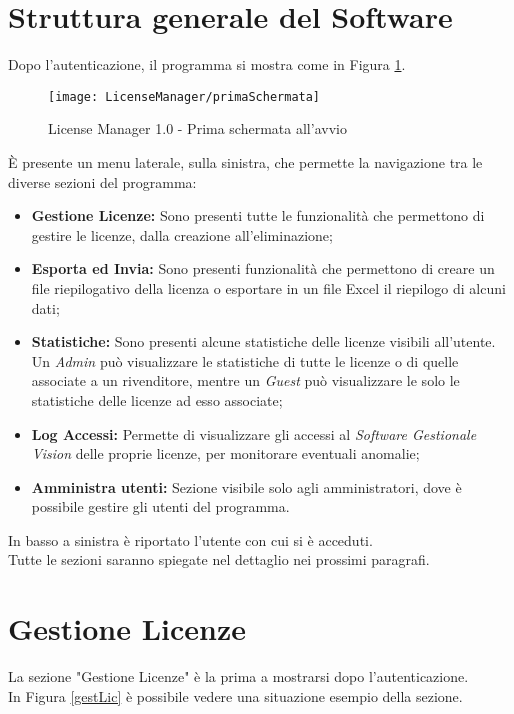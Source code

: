 \section{Struttura generale del Software}
Dopo l'autenticazione, il programma si mostra come in Figura \ref{primscher}.

\begin{figure}[!h] 
    \centering 
    \texttt{[image: LicenseManager/primaSchermata]} 
    \caption{License Manager 1.0 - Prima schermata all'avvio}
    \label{primscher}
\end{figure}

È presente un menu laterale, sulla sinistra, che permette la navigazione tra le diverse sezioni del programma:

\begin{itemize}
\item \textbf{Gestione Licenze:} Sono presenti tutte le funzionalità che permettono di gestire le licenze, dalla creazione all’eliminazione;
\item \textbf{Esporta ed Invia:} Sono presenti funzionalità che permettono di creare un file riepilogativo della licenza o esportare in un file Excel il riepilogo di alcuni dati;
\item \textbf{Statistiche:} Sono presenti alcune statistiche delle licenze visibili all’utente. Un \textit{Admin} può visualizzare le statistiche di tutte le licenze o di quelle associate a un rivenditore, mentre un \textit{Guest} può visualizzare le solo le statistiche delle licenze ad esso associate;
\item \textbf{Log Accessi:} Permette di visualizzare gli accessi al \textit{Software Gestionale Vision} delle proprie licenze, per monitorare eventuali anomalie;
\item \textbf{Amministra utenti:} Sezione visibile solo agli amministratori, dove è possibile gestire gli utenti del programma.

\end{itemize}

In basso a sinistra è riportato l’utente con cui si è acceduti.
\\
Tutte le sezioni saranno spiegate nel dettaglio nei prossimi paragrafi.

\newpage
\section{Gestione Licenze}
La sezione "Gestione Licenze" è la prima a mostrarsi dopo l'autenticazione. \\ In Figura \ref{gestLic} è possibile vedere una situazione esempio della sezione.

